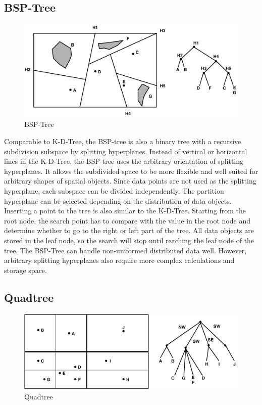 \subsection{BSP-Tree}

\begin{figure}[ht]
\centering
\includegraphics[scale=0.75]{Figures/bsptree.pdf}
\caption{BSP-Tree}
\label{fig:bsptree}
\end{figure}

Comparable to K-D-Tree, the BSP-tree \cite{Fuchs:1980bj} is also a binary tree with a recursive subdivision subspace by splitting hyperplanes. Instead of vertical or horizontal lines in the K-D-Tree, the BSP-tree uses the arbitrary orientation of splitting hyperplanes. It allows the subdivided space to be more flexible and well suited for arbitrary shapes of spatial objects. Since data points are not used as the splitting hyperplane, each subspace can be divided independently. The partition hyperplane can be selected depending on the distribution of data objects. 
Inserting a point to the tree is also similar to the K-D-Tree. Starting from the root node, the search point has to compare with the value in the root node and determine whether to go to the right or left part of the tree. All data objects are stored in the leaf node, so the search will stop until reaching the leaf node of the tree. 
The BSP-Tree can handle non-uniformed distributed data well. However, arbitrary splitting hyperplanes also require more complex calculations and storage space. 



\subsection{Quadtree}

\begin{figure}[ht]
\centering
\includegraphics[scale=0.75]{Figures/quadtree.pdf}
\caption{Quadtree}
\label{fig:quadtree}
\end{figure}

